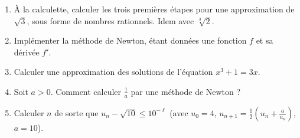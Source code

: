 \documentclass[class=report,crop=false]{standalone}
\begin{document}
\begin{miniexercices}
\begin{enumerate}
  \item \`A la calculette, calculer les trois premières étapes pour une approximation de
  $\sqrt{3}$, sous forme de nombres rationnels.   Idem avec $\sqrt[3]{2}$.

  \item Implémenter la méthode de Newton, étant données une fonction $f$ et sa dérivée $f'$.

  \item Calculer une approximation des solutions de l'équation $x^3+1=3x$.

  \item Soit $a>0$. Comment calculer $\frac{1}{a}$ par une méthode de Newton ?

  \item Calculer $n$ de sorte que $u_n-\sqrt{10} \le 10^{-\ell}$ (avec $u_0=4$,
  $u_{n+1} =\frac{1}{2} \left(u_n+\frac{a}{u_n}\right)$, $a=10$).

\end{enumerate}
\end{miniexercices}



\finchapitre
\end{document}
